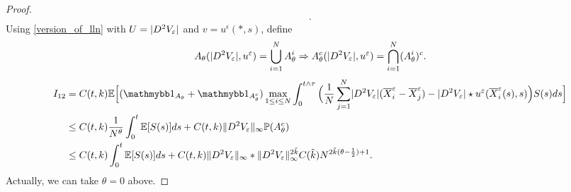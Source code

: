 \begin{proof}
\begin{align*}
.\end{align*}
Using \autoref{version_of_lln} with $U = \lvert D^2V_{\varepsilon}\rvert$ and $v = u^{\epsilon}(*,s) $, define 
\begin{align*}
  A_{\theta }(\lvert D^2 V_{\varepsilon}\rvert,u^{\varepsilon} )= \bigcup_{i=1}^{N}  A^{i}_{\theta } \Rightarrow A_{\theta }^{c} (\lvert D^2 V_{\varepsilon}\rvert,u^{\varepsilon} ) = \bigcap_{i=1}^{N} (A_{\theta }^{i} )^{c} 
.\end{align*}
\begin{align*}
  I_{12} &=   C(t,k) \E\Big[(\cha_{A_\theta} + \cha_{A^{c}_{\theta} })\max_{1\leq i\leq N} \int_0^{t \land \tau } \Big( \frac{1}{N} \sum_{j=1}^{N} \abs{D^2 V_\epsilon}(\overline{X}_i^{\epsilon} - \overline{X}_{j}^{\epsilon}   ) - \abs{D^{2}V_\epsilon } \star  u^{\epsilon}(\overline{X}_i^{\epsilon}(s),s  )  \Big)S(s) ds \Big]\\
         &\le   C(t,k) \frac{1}{N^{\theta } }\int_0^{t}   \E[S(s)] ds  + C(t,k) \|D^2 V_\epsilon\|_{\infty}  \P(A_{\theta }^{c} )\\
        &\le  C(t,k) \int_0^{t}   \E[S(s)] ds  + C(t,k) \|D^2 V_\epsilon\|_{\infty}*\|D^2 V_{\epsilon}\|_{\infty}^{2 \tilde{k} } C(\tilde{k} ) N^{2 \tilde{k}(\theta -\frac{1}{2})+1 } 
.\end{align*}
Actually, we can take $\theta=0$ above.


\end{proof}
